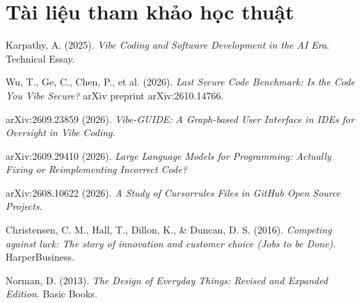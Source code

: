 \documentclass[a4paper,11pt]{article}
\begin{document}
\section{Tài liệu tham khảo học thuật}

\begin{enumerate}[label={[\arabic*]}]
    \item Karpathy, A. (2025). \textit{Vibe Coding and Software Development in the AI Era}. Technical Essay.
    \item Wu, T., Ge, C., Chen, P., et al. (2026). \textit{Last Secure Code Benchmark: Is the Code You Vibe Secure?} arXiv preprint arXiv:2610.14766.
    \item arXiv:2609.23859 (2026). \textit{Vibe-GUIDE: A Graph-based User Interface in IDEs for Oversight in Vibe Coding}.
    \item arXiv:2609.29410 (2026). \textit{Large Language Models for Programming: Actually Fixing or Reimplementing Incorrect Code?}
    \item arXiv:2608.10622 (2026). \textit{A Study of Cursorrules Files in GitHub Open Source Projects}.
    \item Christensen, C. M., Hall, T., Dillon, K., \& Duncan, D. S. (2016). \textit{Competing against luck: The story of innovation and customer choice (Jobs to be Done)}. HarperBusiness.
    \item Norman, D. (2013). \textit{The Design of Everyday Things: Revised and Expanded Edition}. Basic Books.
\end{enumerate}
\end{document}
